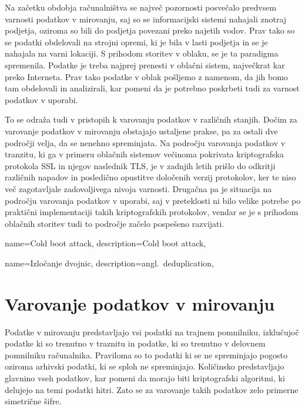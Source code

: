 \documentclass[12pt,a4paper,openany]{book}
\begin{document}
Na začetku obdobja računalništva se največ pozornosti posvečalo predvsem varnosti podatkov v mirovanju, saj so se informacijski sistemi nahajali znotraj podjetja, oziroma so bili do podjetja povezani preko najetih vodov. Prav tako so se podatki obdelovali na strojni opremi, ki je bila v lasti podjetja in se je nahajala na varni lokaciji. S prihodom storitev v oblaku, se je ta paradigma spremenila. Podatke je treba najprej prenesti v oblačni sistem, največkrat kar preko Interneta. Prav tako podatke v oblak pošljemo z namenom, da jih bomo tam obdelovali in analizirali, kar pomeni da je potrebno poskrbeti tudi za varnost podatkov v uporabi.


To se odraža tudi v pristopih k varovanju podatkov v različnih stanjih. Dočim za varovanje podatkov v mirovanju obstajajo ustaljene prakse, pa za ostali dve področji velja, da se nenehno spreminjata. Na področju varovanja podatkov v tranzitu, ki ga v primeru oblačnih sistemov večinoma pokrivata kriptografska protokola \acrfull{SSL} in njegov naslednik \acrfull{TLS}, je v zadnjih letih prišlo do odkritji različnih napadov in posledično opustitve določenih verzij protokolov, ker te niso več zagotavljale zadovoljivega nivoja varnosti. Drugačna pa je situacija na področju varovanja podatkov v uporabi, saj v preteklosti ni bilo velike potrebe po praktični implementaciji takih kriptografskih protokolov, vendar se je s prihodom oblačnih storitev tudi to področje začelo pospešeno razvijati.


{
  name=Cold boot attack,
  description={Cold boot attack},
}

{
  name=Izločanje dvojnic,
  description={angl.\ deduplication},
}

\section{Varovanje podatkov v mirovanju}
\label{subs:Varovanje podatkov v mirovanju}

Podatke v mirovanju predstavljajo vsi podatki na trajnem pomnilniku, izklučujoč podatke ki so trenutno v traznitu in podatke, ki so trenutno v delovnem pomnilniku računalnika. Praviloma so to podatki ki se ne spreminjajo pogosto oziroma arhivski podatki, ki se sploh ne spreminjajo. Količinsko predstavljajo glavnino vseh podatkov, kar pomeni da morajo biti kriptografski algoritmi, ki delujejo na temi podatki hitri. Zato se za varovanje takih podatkov zelo primerne simetrične šifre.
\end{document}
